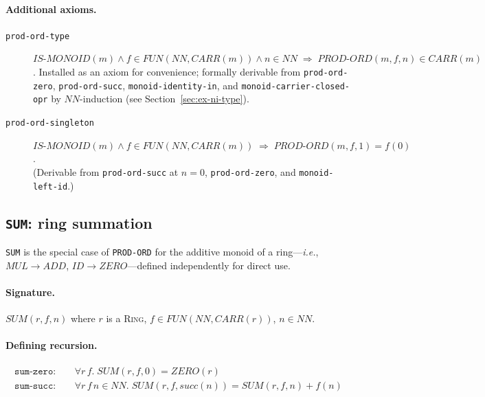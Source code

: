 \paragraph{Additional axioms.}
\begin{description}
\item[\texttt{prod-ord-type}]
  $\mathit{IS\text{-}MONOID}(m) \wedge f \in \mathit{FUN}(\mathit{NN}, \mathit{CARR}(m))
  \wedge n \in \mathit{NN} \;\Rightarrow\;
  \mathit{PROD\text{-}ORD}(m, f, n) \in \mathit{CARR}(m)$.
  Installed as an axiom for convenience; formally derivable from
  \texttt{prod-ord-zero}, \texttt{prod-ord-succ}, \texttt{monoid-identity-in},
  and \texttt{monoid-carrier-closed-opr} by $\mathit{NN}$-induction
  (see Section~\ref{sec:ex-ni-type}).

\item[\texttt{prod-ord-singleton}]
  $\mathit{IS\text{-}MONOID}(m) \wedge f \in \mathit{FUN}(\mathit{NN}, \mathit{CARR}(m))
  \;\Rightarrow\; \mathit{PROD\text{-}ORD}(m, f, 1) = f(0)$.\\
  (Derivable from \texttt{prod-ord-succ} at $n=0$, \texttt{prod-ord-zero},
  and \texttt{monoid-left-id}.)
\end{description}

\subsection{\texttt{SUM}: ring summation}

\texttt{SUM} is the special case of \texttt{PROD-ORD} for the additive
monoid of a ring---\textit{i.e.}, $\mathit{MUL} \to \mathit{ADD}$,
$\mathit{ID} \to \mathit{ZERO}$---defined independently for direct use.

\paragraph{Signature.}
$\mathit{SUM}(r, f, n)$ where $r$ is a \textsc{Ring},
$f \in \mathit{FUN}(\mathit{NN}, \mathit{CARR}(r))$, $n \in \mathit{NN}$.

\paragraph{Defining recursion.}

\begin{align*}
\mathtt{sum\text{-}zero}: &\quad
  \forall r\, f.\; \mathit{SUM}(r, f, 0) = \mathit{ZERO}(r) \\
\mathtt{sum\text{-}succ}: &\quad
  \forall r\, f\, n \in \mathit{NN}.\;
  \mathit{SUM}(r, f, \mathit{succ}(n))
  = \mathit{SUM}(r, f, n) + f(n)
\end{align*}

